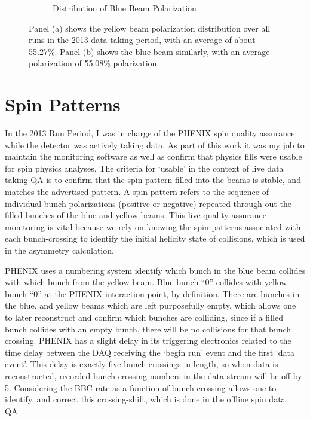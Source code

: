 \begin{figure}[H]
\begin{subfigure}[t]{0.5\textwidth}
    \caption{Distribution of Blue Beam Polarization}
		\label{fig:pol_blue}
	\end{subfigure}
	\caption{ 
    Panel (a) shows the yellow beam polarization distribution over all runs in
    the 2013 data taking period, with an average of about 55.27\%. Panel (b)
    shows the blue beam similarly, with an average polarization of 55.08\%
    polarization.
  }
	\label{fig:pol_distribution}
\end{figure}

\section{Spin Patterns}
\label{sec:asym_spin_patterns}

In the 2013 Run Period, I was in charge of the PHENIX spin quality assurance
while the detector was actively taking data. As part of this work it was my job
to maintain the monitoring software as well as confirm that physics fills were
usable for spin physics analyses. The criteria for `usable' in the context of
live data taking QA is to confirm that the spin pattern filled into the beams is
stable, and matches the advertised pattern. A spin pattern refers to the
sequence of individual bunch polarizations (positive or negative) repeated
through out the filled bunches of the blue and yellow beams. This live quality
assurance monitoring is vital because we rely on knowing the spin patterns
associated with each bunch-crossing to identify the initial helicity state of
collisions, which is used in the asymmetry calculation. 

PHENIX uses a numbering system identify which bunch in the blue beam collides
with which bunch from the yellow beam. Blue bunch ``0'' collides with yellow
bunch ``0'' at the PHENIX interaction point, by definition.  There are bunches
in the blue, and yellow beams which are left purposefully empty, which allows
one to later reconstruct and confirm which bunches are colliding, since if a
filled bunch collides with an empty bunch, there will be no collisions for that
bunch crossing. PHENIX has a slight delay in its triggering electronics related
to the time delay between the DAQ receiving the `begin run' event and the first
`data event'. This delay is exactly five bunch-crossings in length, so when data
is reconstructed, recorded bunch crossing numbers in the data stream will be off
by 5. Considering the BBC rate as a function of bunch crossing allows one to
identify, and correct this crossing-shift, which is done in the offline spin
data QA~\cite{Kim2014}.

